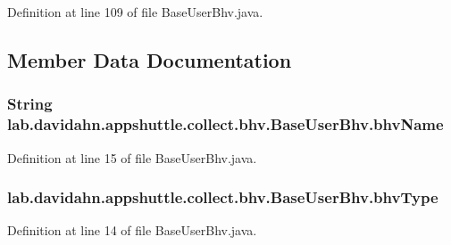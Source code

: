 \-Definition at line 109 of file \-Base\-User\-Bhv.\-java.



\subsection{\-Member \-Data \-Documentation}
\hypertarget{classlab_1_1davidahn_1_1appshuttle_1_1collect_1_1bhv_1_1_base_user_bhv_aa211c66df8abf7df665859d662891cc0}{
\subsubsection[{bhv\-Name}]{\setlength{\rightskip}{0pt plus 5cm}\-String {\bf lab.\-davidahn.\-appshuttle.\-collect.\-bhv.\-Base\-User\-Bhv.\-bhv\-Name}}}\label{classlab_1_1davidahn_1_1appshuttle_1_1collect_1_1bhv_1_1_base_user_bhv_aa211c66df8abf7df665859d662891cc0}


\-Definition at line 15 of file \-Base\-User\-Bhv.\-java.

\hypertarget{classlab_1_1davidahn_1_1appshuttle_1_1collect_1_1bhv_1_1_base_user_bhv_a29dae66ba4bf89a75849d77a35a57cb2}{
\subsubsection[{bhv\-Type}]{ {\bf lab.\-davidahn.\-appshuttle.\-collect.\-bhv.\-Base\-User\-Bhv.\-bhv\-Type}}}\label{classlab_1_1davidahn_1_1appshuttle_1_1collect_1_1bhv_1_1_base_user_bhv_a29dae66ba4bf89a75849d77a35a57cb2}


\-Definition at line 14 of file \-Base\-User\-Bhv.\-java.

